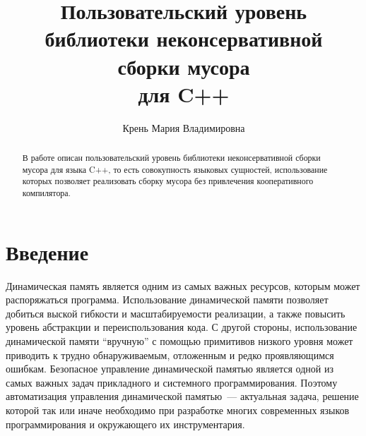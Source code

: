 
\title{Пользовательский уровень\\
библиотеки неконсервативной\\ 
сборки мусора\\
для C++}
%
\author{Крень Мария Владимировна}
%
%
%

\maketitle              %

\begin{abstract}
В работе описан пользовательский уровень библиотеки неконсервативной сборки
мусора для языка C++, то есть совокупность языковых сущностей, использование
которых позволяет реализовать сборку мусора без привлечения 
кооперативного компилятора.
\end{abstract}

\section*{Введение}

Динамическая память является одним из самых важных ресурсов, которым может распоряжаться программа. Использование
динамической памяти позволяет добиться выской гибкости и масштабируемости реализации, а также повысить уровень
абстракции и переиспользования кода. С другой стороны, использование динамической памяти ``вручную'' с помощью
примитивов низкого уровня может приводить к трудно обнаруживаемым, отложенным и редко проявляющимся ошибкам. 
Безопасное управление динамической памятью является одной из самых важных задач прикладного и системного программирования. 
Поэтому автоматизация управления динамической памятью~--- актуальная задача, решение которой так или иначе необходимо при
разработке многих современных языков программирования и окружающего их инструментария.

